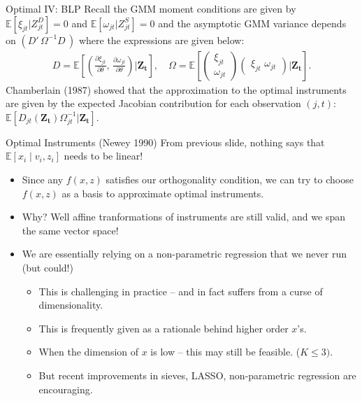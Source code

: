 \begin{frame}{Optimal IV: BLP}
Recall the GMM moment conditions are given by $\mathbb{E}[\xi_{jt} | Z_{jt}^D]=0$ and $\mathbb{E}[\omega_{jt} | Z_{jt}^S]=0$ and the asymptotic GMM variance depends on $(D'\, \Omega^{-1} D\,)$ where the expressions are given below:
\begin{align*}
    D=\mathbb{E}\left[
    \left(\frac{\partial \xi_{jt}}{\partial \theta}, \,
    \frac{\partial \omega_{jt}}{\partial \theta} \right)
| \symbf{Z_t} \right], \quad 
\Omega = \mathbb{E}\left[
\begin{pmatrix}
    \xi_{jt} \\
    \omega_{jt}
\end{pmatrix}
\begin{pmatrix}
    \xi_{jt}\, \,
    \omega_{jt}
\end{pmatrix}
| \symbf{Z_t} \right].
\end{align*}
Chamberlain (1987) showed that the approximation to the optimal instruments are given by the expected Jacobian contribution for each observation $(j,t)$: $\mathbb{E}[D_{jt}(\symbf{Z_t}) \Omega_{jt}^{-1} | \symbf{Z_t}]$.
\end{frame}

\begin{frame}{Optimal Instruments (Newey 1990)}
From previous slide, nothing says that $\mathbb{E}\left[x_i \mid v_i, z_i \right]$ needs to be \alert{linear}!
\begin{itemize}
\item Since any $f(x,z)$ satisfies our orthogonality condition, we can try to choose $f(x,z)$ as a \alert{basis} to approximate optimal instruments.
\item Why? Well affine tranformations of instruments are still valid, and we span the same vector space!
\item We are essentially relying on a non-parametric regression that we never run (but could!)
\begin{itemize}
\item This is challenging in practice -- and in fact suffers from a curse of dimensionality.
\item This is frequently given as a rationale behind higher order $x$'s.
\item When the dimension of $x$ is low -- this may still be feasible. ($K \leq 3)$.
\item But recent improvements in sieves, LASSO, non-parametric regression are encouraging.
\end{itemize}
\end{itemize}
\end{frame}




